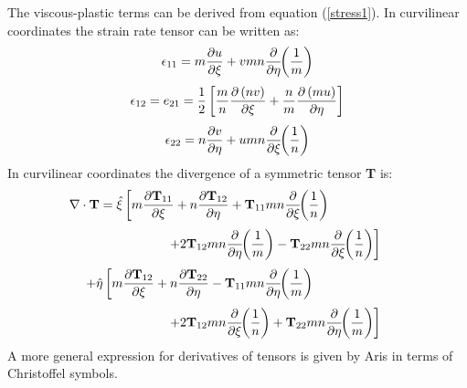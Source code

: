 The viscous-plastic terms can be derived from equation
(\ref{stress1}).  In curvilinear coordinates the strain rate tensor
can be written as:
\begin{equation}
   \epsilon_{11} = m {\partial u \over \partial \xi} +
    vmn {\partial \over \partial \eta} \!\! \left( {1 \over m} \right)
\end{equation}
\begin{equation}
   \epsilon_{12} = e_{21} = {1 \over 2} \left[
   {m \over n} {\partial \left( nv \right) \over \partial \xi}
   + {n \over m} {\partial \left( mu \right) \over \partial \eta}
   \right]
\end{equation}
\begin{equation}
   \epsilon_{22} = n {\partial v \over \partial \eta} +
    umn {\partial \over \partial \xi} \!\! \left( {1 \over n} \right)
\end{equation}
In curvilinear coordinates the divergence of a symmetric tensor {\bf T}
is:
\[
    \nabla \cdot \mbox{\bf T} =
    \hat{\xi} \left[ m
    {\partial \mbox{\bf T}_{11} \over \partial \xi}
    + n {\partial \mbox{\bf T}_{12} \over \partial \eta}
    + \mbox{\bf T}_{11} mn {\partial \over \partial \xi} \!\!
    \left( {1 \over n} \right) \right. \mbox{\hspace{2 cm}}
\]
\[
    \mbox{\hspace{2 cm}} \left. + 2 \mbox{\bf T}_{12} mn
    {\partial \over \partial \eta} \!\! \left( {1 \over m} \right)
    - \mbox{\bf T}_{22} mn
    {\partial \over \partial \xi} \!\! \left( {1 \over n} \right)
    \right]
\]
\[
    + \hat{\eta} \left[ m
    {\partial \mbox{\bf T}_{12} \over \partial \xi}
    + n {\partial \mbox{\bf T}_{22} \over \partial \eta}
    - \mbox{\bf T}_{11} mn {\partial \over \partial \eta} \!\!
    \left( {1 \over m} \right) \right. \mbox{\hspace{2 cm}}
\]
\begin{equation}
    \mbox{\hspace{2 cm}} \left. + 2 \mbox{\bf T}_{12} mn
    {\partial \over \partial \xi} \!\! \left( {1 \over n} \right)
    + \mbox{\bf T}_{22} mn
    {\partial \over \partial \eta} \!\! \left( {1 \over m} \right)
    \right]
\end{equation}
A more general expression for derivatives of tensors is given by
Aris \cite{Aris} in terms of Christoffel symbols.

